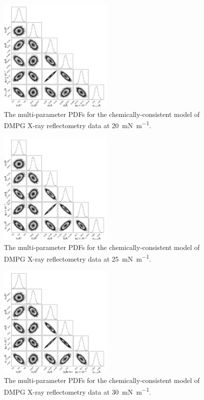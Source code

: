 \documentclass[amsmath,amssymb,superscriptaddress]{revtex4-1}
\begin{document}
\begin{figure}[H]
	\centering
	\includegraphics[width=0.50\textwidth]{figures/dmpg2_all_corner}
	\caption{The multi-parameter PDFs for the chemically-consistent model of DMPG X-ray reflectometry data at \SI{20}{\milli\newton\per\meter}. }
	\label{fig:dmpg2}
\end{figure}
\begin{figure}[H]
	\centering
	\includegraphics[width=0.50\textwidth]{figures/dmpg3_all_corner}
	\caption{The multi-parameter PDFs for the chemically-consistent model of DMPG X-ray reflectometry data at \SI{25}{\milli\newton\per\meter}.}
	\label{fig:dmpg3}
\end{figure}
\begin{figure}[H]
	\centering
	\includegraphics[width=0.50\textwidth]{figures/dmpg4_all_corner}
	\caption{The multi-parameter PDFs for the chemically-consistent model of DMPG X-ray reflectometry data at \SI{30}{\milli\newton\per\meter}.}
	\label{fig:dmpg4}
\end{figure}
\end{document}
